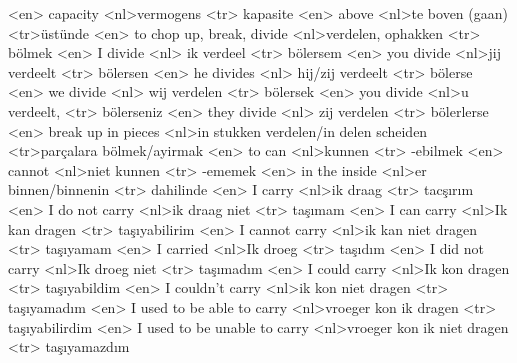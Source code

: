 <en> capacity 
<nl>vermogens 
<tr> kapasite 
<en> above 
<nl>te boven (gaan) 
<tr>üstünde 
<en> to chop up, break, divide 
<nl>verdelen,  ophakken 
<tr> bölmek 
<en> I divide 
<nl> ik verdeel  
<tr> bölersem  
<en> you divide 
<nl>jij verdeelt  
<tr> bölersen  
<en> he divides 
<nl> hij/zij verdeelt 
<tr> bölerse
<en> we divide 
<nl> wij verdelen 
<tr> bölersek
<en> you divide 
<nl>u verdeelt,  
<tr> bölerseniz 
<en> they divide 
<nl> zij verdelen 
<tr> bölerlerse  
<en> break up in pieces 
<nl>in stukken verdelen/in delen scheiden  
<tr>parçalara bölmek/ayirmak  
<en> to can 
<nl>kunnen 
<tr> -ebilmek
<en> cannot 
<nl>niet kunnen 
<tr> -ememek  
<en> in the inside 
<nl>er binnen/binnenin 
<tr> dahilinde 
<en> I carry 
<nl>ik draag 
<tr> tac\c{s}\i r\i m
<en> I do not carry 
<nl>ik draag niet 
<tr> taşımam 
<en> I can carry 
<nl>Ik kan dragen 
<tr> taşıyabilirim 
<en> I cannot carry 
<nl>ik kan niet dragen 
<tr> taşıyamam 
<en> I carried 
<nl>Ik droeg 
<tr> taşıdım
<en> I did not  carry 
<nl>Ik droeg niet 
<tr> taşımadım 
<en> I could carry 
<nl>Ik kon dragen 
<tr> taşıyabildim 
<en> I couldn't carry 
<nl>ik kon niet dragen 
<tr> taşıyamadım  
<en> I used to be  able to carry 
<nl>vroeger kon ik dragen 
<tr> taşıyabilirdim 
<en> I used to be unable to carry 
<nl>vroeger kon ik niet dragen 
<tr> taşıyamazdım 
